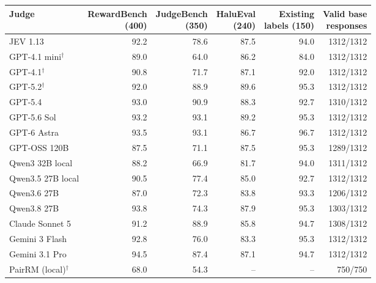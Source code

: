 \begin{tabular}{@{}lrrrrr@{}}
\toprule
Judge & \shortstack{RewardBench\\(400)} & \shortstack{JudgeBench\\(350)} & \shortstack{HaluEval\\(240)} & \shortstack{Existing\\labels (150)} & \shortstack{Valid base\\responses} \\
\midrule
JEV 1.13 & 92.2 & 78.6 & 87.5 & 94.0 & 1312/1312 \\
GPT-4.1 mini$^{\dagger}$ & 89.0 & 64.0 & 86.2 & 84.0 & 1312/1312 \\
GPT-4.1$^{\dagger}$ & 90.8 & 71.7 & 87.1 & 92.0 & 1312/1312 \\
GPT-5.2$^{\dagger}$ & 92.0 & 88.9 & 89.6 & 95.3 & 1312/1312 \\
GPT-5.4 & 93.0 & 90.9 & 88.3 & 92.7 & 1310/1312 \\
GPT-5.6 Sol & 93.2 & 93.1 & 89.2 & 95.3 & 1312/1312 \\
GPT-6 Astra & 93.5 & 93.1 & 86.7 & 96.7 & 1312/1312 \\
GPT-OSS 120B & 87.5 & 71.1 & 87.5 & 95.3 & 1289/1312 \\
Qwen3 32B local & 88.2 & 66.9 & 81.7 & 94.0 & 1311/1312 \\
Qwen3.5 27B local & 90.5 & 77.4 & 85.0 & 92.7 & 1312/1312 \\
Qwen3.6 27B & 87.0 & 72.3 & 83.8 & 93.3 & 1206/1312 \\
Qwen3.8 27B & 93.8 & 74.3 & 87.9 & 95.3 & 1303/1312 \\
Claude Sonnet 5 & 91.2 & 88.9 & 85.8 & 94.7 & 1308/1312 \\
Gemini 3 Flash & 92.8 & 76.0 & 83.3 & 95.3 & 1312/1312 \\
Gemini 3.1 Pro & 94.5 & 87.4 & 87.1 & 94.7 & 1312/1312 \\
PairRM (local)$^{\dagger}$ & 68.0 & 54.3 & -- & -- & 750/750 \\
\bottomrule
\end{tabular}
